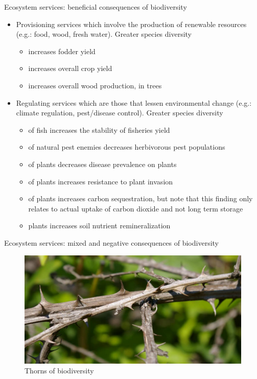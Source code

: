 \documentclass[ignorenonframetext,aspectratio=169]{beamer}
\providecommand{\tightlist}{%
  \setlength{\itemsep}{0pt}\setlength{\parskip}{0pt}}
\begin{document}
\begin{frame}{Ecosystem services: beneficial consequences of
biodiversity}
\protect\hypertarget{ecosystem-services-beneficial-consequences-of-biodiversity}{}

\begin{itemize}
\tightlist
\item
  Provisioning services which involve the production of renewable
  resources (e.g.: food, wood, fresh water). Greater species diversity

  \begin{itemize}
  \tightlist
  \item
    increases fodder yield
  \item
    increases overall crop yield
  \item
    increases overall wood production, in trees
  \end{itemize}
\item
  Regulating services which are those that lessen environmental change
  (e.g.: climate regulation, pest/disease control). Greater species
  diversity

  \begin{itemize}
  \tightlist
  \item
    of fish increases the stability of fisheries yield
  \item
    of natural pest enemies decreases herbivorous pest populations
  \item
    of plants decreases disease prevalence on plants
  \item
    of plants increases resistance to plant invasion
  \item
    of plants increases carbon sequestration, but note that this finding
    only relates to actual uptake of carbon dioxide and not long term
    storage
  \item
    plants increases soil nutrient remineralization
  \end{itemize}
\end{itemize}

\end{frame}

\begin{frame}{Ecosystem services: mixed and negative consequences of
biodiversity}
\protect\hypertarget{ecosystem-services-mixed-and-negative-consequences-of-biodiversity}{}

\begin{figure}
\includegraphics[width=0.55\linewidth]{./../images/biodiversity_thorns} \caption{Thorns of biodiversity}\label{fig:biodiversity-thorns}
\end{figure}

\end{frame}
\end{document}
